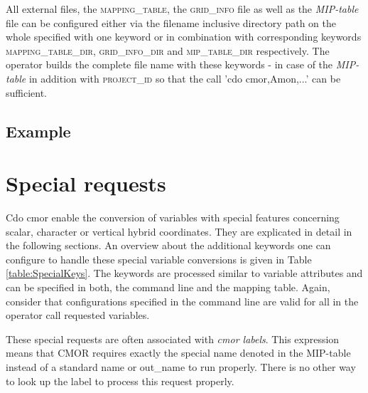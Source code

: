 
All external files, the \textsc{mapping\_table}, the \textsc{grid\_info} file as well as the \textit{MIP-table} file can be configured either via the filename inclusive directory path on the whole specified with one keyword or in combination with corresponding keywords \textsc{mapping\_table\_dir}, \textsc{grid\_info\_dir} and \textsc{mip\_table\_dir} respectively. The operator builds the complete file name with these keywords - in case of the \textit{MIP-table} in addition with \textsc{project\_id} so that the call 'cdo cmor,Amon,...' can be sufficient.

\subsection{Example}


\section{Special requests}

Cdo cmor enable the conversion of variables with special features concerning scalar, character or vertical hybrid coordinates. They are explicated in detail in the following sections. An overview about the additional keywords one can configure to handle these special variable conversions is given in Table \ref{table:SpecialKeys}. The keywords are processed similar to variable attributes and can be specified in both, the command line and the mapping table. Again, consider that configurations specified in the command line are valid for all in the operator call requested variables.

These special requests are often associated with \textit{cmor labels}. This expression means that CMOR requires exactly the special name denoted in the MIP-table instead of a standard name or out\_name to run properly. There is no other way to look up the label to process this request properly.

